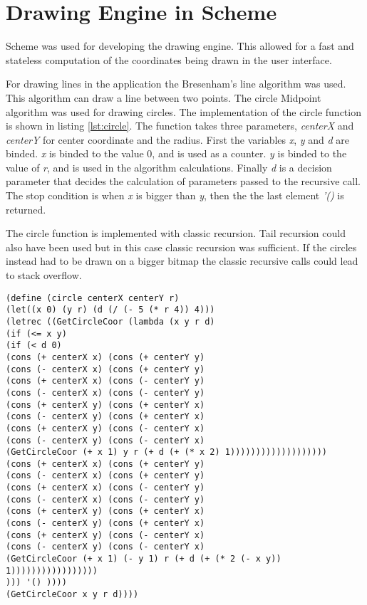 \section{Drawing Engine in Scheme}
Scheme was used for developing the drawing engine. This allowed for a fast and stateless computation of the coordinates being drawn in the user interface. 

For drawing lines in the application the Bresenham’s line algorithm was used. This algorithm can draw a line between two points. The circle Midpoint algorithm was used for drawing circles. The implementation of the circle function is shown in listing \ref{lst:circle}. The function takes three parameters, \emph{centerX	} and \emph{centerY} for center coordinate and the radius. First the variables \emph{x}, \emph{y} and \emph{d} are binded. \emph{x} is binded to the value 0, and is used as a counter. \emph{y} is binded to the value of \emph{r}, and is used in the algorithm calculations. Finally \emph{d} is  a decision parameter that decides the calculation of parameters passed to the recursive call. The stop condition is when \emph{x} is bigger than \emph{y}, then the the last element \emph{'()} is returned.
	
The circle function is implemented with classic recursion. Tail recursion could also have been used but in this case classic recursion was sufficient. If the circles instead had to be drawn on a bigger bitmap the classic recursive calls could lead to stack overflow.

\newpage
\begin{lstlisting}[caption={Scheme function circle}, label=lst:circle]
(define (circle centerX centerY r)
(let((x 0) (y r) (d (/ (- 5 (* r 4)) 4)))
(letrec ((GetCircleCoor (lambda (x y r d)
(if (<= x y)
(if (< d 0)    
(cons (+ centerX x) (cons (+ centerY y)                                                
(cons (- centerX x) (cons (+ centerY y)
(cons (+ centerX x) (cons (- centerY y)         
(cons (- centerX x) (cons (- centerY y)
(cons (+ centerX y) (cons (+ centerY x)
(cons (- centerX y) (cons (+ centerY x)
(cons (+ centerX y) (cons (- centerY x)
(cons (- centerX y) (cons (- centerY x)  
(GetCircleCoor (+ x 1) y r (+ d (+ (* x 2) 1)))))))))))))))))))
(cons (+ centerX x) (cons (+ centerY y)                                                
(cons (- centerX x) (cons (+ centerY y)
(cons (+ centerX x) (cons (- centerY y)         
(cons (- centerX x) (cons (- centerY y)
(cons (+ centerX y) (cons (+ centerY x)
(cons (- centerX y) (cons (+ centerY x)
(cons (+ centerX y) (cons (- centerY x)
(cons (- centerX y) (cons (- centerY x)  
(GetCircleCoor (+ x 1) (- y 1) r (+ d (+ (* 2 (- x y)) 1)))))))))))))))))
))) '() ))))
(GetCircleCoor x y r d))))   
\end{lstlisting}

